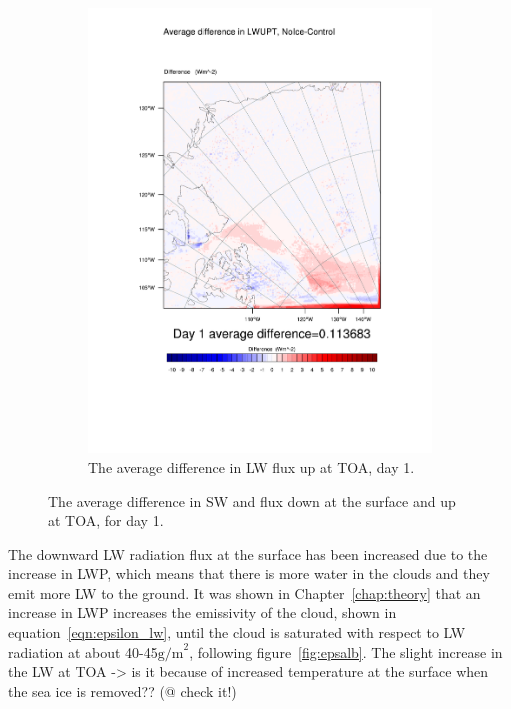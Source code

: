\begin{figure}
\begin{subfigure}{0.48\textwidth}
		\includegraphics[width=\textwidth]{results/noice/diff_NoIce_LWUPT_Day1.pdf}
		\caption{The average difference in LW flux up at TOA, day 1.}
		\label{subfig:lwup_r2Day1}
	\end{subfigure}
	\caption{The average difference in SW and flux down at the surface and up at TOA, for day 1.}
	\label{fig:radiation_r2Day1}
\end{figure}

The downward LW radiation flux at the surface has been increased due to the increase in LWP, which means that there is more water in the clouds and they emit more LW to the ground. It was shown in Chapter~\ref{chap:theory} that an increase in LWP increases the emissivity of the cloud, shown in equation~\ref{eqn:epsilon_lw}, until the cloud is saturated with respect to LW radiation at about 40-45$\text{g/m}^2$, following figure~\ref{fig:epsalb}.
The slight increase in the LW at TOA -> is it because of increased temperature at the surface when the sea ice is removed?? (@ check it!)


